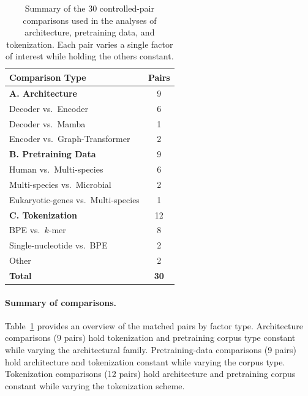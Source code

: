 \documentclass{llmxive}
\begin{document}
\begin{table}[!htbp]
\centering
\small
\begin{tabular}{@{}lc@{}}
\toprule
\textbf{Comparison Type} & \textbf{Pairs} \\
\midrule
\textbf{A. Architecture}                                  & 9 \\
\quad Decoder vs.\ Encoder                                & 6 \\
\quad Decoder vs.\ Mamba                                  & 1 \\
\quad Encoder vs.\ Graph-Transformer                      & 2 \\
\midrule
\textbf{B. Pretraining Data}                              & 9 \\
\quad Human vs.\ Multi-species                            & 6 \\
\quad Multi-species vs.\ Microbial                        & 2 \\
\quad Eukaryotic-genes vs.\ Multi-species                 & 1 \\
\midrule
\textbf{C. Tokenization}                                  & 12 \\
\quad BPE vs.\ $k$-mer                                    & 8 \\
\quad Single-nucleotide vs.\ BPE                          & 2 \\
\quad Other                                               & 2 \\
\midrule
\textbf{Total}                                            & \textbf{30} \\
\bottomrule
\end{tabular}
\caption{Summary of the $30$ controlled-pair comparisons used in the
analyses of architecture, pretraining data, and tokenization. Each pair
varies a single factor of interest while holding the others constant.}
\label{tab:pairs_summary}
\end{table}

\paragraph{Summary of comparisons.}
Table~\ref{tab:pairs_summary} provides an overview of the matched pairs
by factor type. Architecture comparisons (9 pairs) hold tokenization and
pretraining corpus type constant while varying the architectural family.
Pretraining-data comparisons (9 pairs) hold architecture and tokenization
constant while varying the corpus type. Tokenization comparisons (12 pairs)
hold architecture and pretraining corpus constant while varying the
tokenization scheme.
\end{document}
